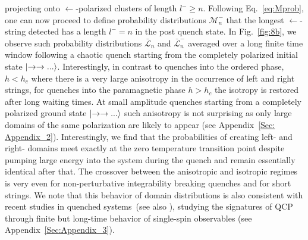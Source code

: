 \documentclass[aps,prx,twocolumn]{revtex4-2}
\begin{document}
projecting onto $\leftarrow$-polarized clusters of length $l^{-}\ge n$. Following Eq.~\eqref{eq:Mprob}, one can now proceed to define probability distributions $\mathcal{M}_n^-$ that the longest $\leftarrow$-string detected has a length $l^-= n$ in the post quench state. In Fig.~\ref{fig:8b},   {we observe such probability distributions $\bar{\mathcal{L}}_n$ and $\bar{\mathcal{L}}_n^-$ averaged over a long finite time window} following a chaotic quench starting from the completely polarized initial state $\ket{\rightarrow\rightarrow...}$.   {Interestingly, in contrast to quenches into the ordered phase, $h<h_c$  where there is a very large anisotropy in the occurrence of left and right strings,  for quenches into the paramagnetic phase $h>h_c$ the isotropy is restored after long waiting times.  At small amplitude quenches starting from a completely polarized ground state $\ket{\rightarrow\rightarrow...}$ such anisotropy is not surprising as only large domains of the same polarization are likely to appear (see Appendix~\ref{Sec: Appendix_2}).  Interestingly, we find that the probabilities of creating left- and right- domains meet exactly at the  {zero temperature transition point despite pumping large energy into the system during the quench} and remain essentially identical after that.  The crossover between the anisotropic and isotropic regimes is very even for non-perturbative integrability breaking quenches and for short strings.  We note that this behavior of domain distributions is also consistent with recent studies in quenched systems~(see also \cite{halimeh21}), studying the signatures of QCP through finite but long-time behavior of single-spin observables (see Appendix~\ref{Sec:Appendix_3})}.\\
\end{document}

